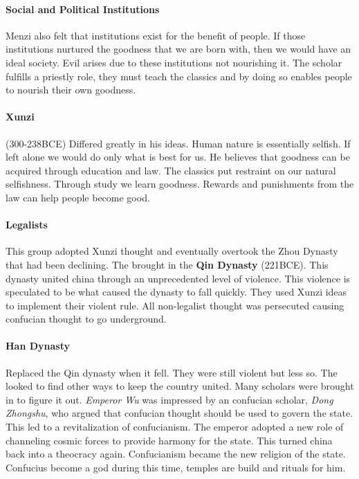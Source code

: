 \documentclass{article}
\begin{document}
\paragraph{Social and Political Institutions}
\label{par:social_and_political_institutions}
Menzi also felt that institutions exist for the benefit of people. If those institutions nurtured the goodness that we are born with, then we would have an ideal society. Evil arises due to these institutions not nourishing it. The scholar fulfills a priestly role, they must teach the classics and by doing so enables people to nourish their own goodness.

\paragraph{Xunzi}
\label{par:xunzi}
(300-238BCE) Differed greatly in his ideas. Human nature is essentially selfish. If left alone we would do only what is best for us. He believes that goodness can be acquired through education and law. The classics put restraint on our natural selfishness. Through study we learn goodness. Rewards and punishments from the law can help people become good.

\paragraph{Legalists}
\label{par:legalists}
This group adopted Xunzi thought and eventually overtook the Zhou Dynasty that had been declining. The brought in the \textbf{Qin Dynasty} (221BCE). This dynasty united china through an unprecedented level of violence. This violence is speculated to be what caused the dynasty to fall quickly. They used Xunzi ideas to implement their violent rule. All non-legalist thought was persecuted causing confucian thought to go underground.

\paragraph{Han Dynasty}
\label{par:han_dynasty}
Replaced the Qin dynasty when it fell. They were still violent but less so. The looked to find other ways to keep the country united. Many scholars were brought in to figure it out. \emph{Emperor Wu} was impressed by an confucian scholar, \emph{Dong Zhongshu}, who argued that confucian thought should be used to govern the state. This led to a revitalization of confucianism. The emperor adopted a new role of channeling cosmic forces to provide harmony for the state. This turned china back into a theocracy again. Confucianism became the new religion of the state. Confucius become a god during this time, temples are build and rituals for him.
\end{document}
